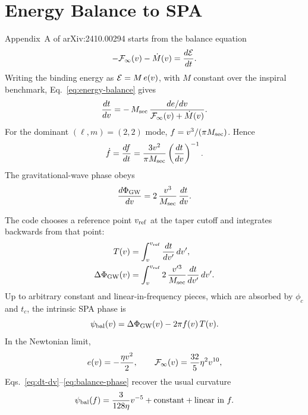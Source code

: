 \documentclass[11pt]{article}
\begin{document}
\section{Energy Balance to SPA}

Appendix~A of arXiv:2410.00294 starts from the balance equation
\begin{equation}
  -{\cal F}_\infty(v)-\dot M(v) = \frac{d{\cal E}}{dt}.
  \label{eq:energy-balance}
\end{equation}
Writing the binding energy as \({\cal E}=M\,e(v)\), with \(M\) constant over
the inspiral benchmark, Eq.~\eqref{eq:energy-balance} gives
\begin{equation}
  \frac{dt}{dv}
  =
  -\,M_{\rm sec}\,
  \frac{de/dv}{{\cal F}_\infty(v)+\dot M(v)} .
  \label{eq:dt-dv}
\end{equation}
For the dominant \((\ell,m)=(2,2)\) mode, \(f=v^3/(\pi M_{\rm sec})\).  Hence
\begin{equation}
  \dot f
  =
  \frac{df}{dt}
  =
  \frac{3v^2}{\pi M_{\rm sec}}\left(\frac{dt}{dv}\right)^{-1}.
  \label{eq:fdot}
\end{equation}
The gravitational-wave phase obeys
\begin{equation}
  \frac{d\Phi_{\rm GW}}{dv}
  =
  2\,\frac{v^3}{M_{\rm sec}}\,\frac{dt}{dv}.
  \label{eq:dphi-dv}
\end{equation}

The code chooses a reference point \(v_{\rm ref}\) at the taper cutoff and
integrates backwards from that point:
\begin{align}
  T(v)
  &=
  \int_v^{v_{\rm ref}} \frac{dt}{dv'}\,dv',
  \\
  \Delta\Phi_{\rm GW}(v)
  &=
  \int_v^{v_{\rm ref}}
  2\,\frac{v'^3}{M_{\rm sec}}\frac{dt}{dv'}\,dv' .
\end{align}
Up to arbitrary constant and linear-in-frequency pieces, which are absorbed by
\(\phi_c\) and \(t_c\), the intrinsic SPA phase is
\begin{equation}
  \psi_{\rm bal}(v)
  =
  \Delta\Phi_{\rm GW}(v)-2\pi f(v)\,T(v).
  \label{eq:balance-phase}
\end{equation}
In the Newtonian limit,
\begin{equation}
  e(v)=-\frac{\eta v^2}{2},
  \qquad
  {\cal F}_\infty(v)=\frac{32}{5}\eta^2 v^{10},
\end{equation}
Eqs.~\eqref{eq:dt-dv}--\eqref{eq:balance-phase} recover the usual curvature
\begin{equation}
  \psi_{\rm bal}(f)
  =
  \frac{3}{128\eta}v^{-5}
  + \hbox{constant}
  + \hbox{linear in } f .
\end{equation}
\end{document}
